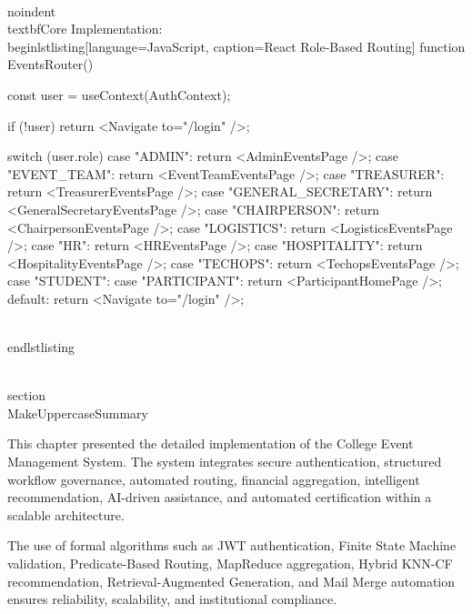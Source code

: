 \\noindent\\textbf{Core Implementation:}
\\begin{lstlisting}[language=JavaScript, caption=React Role-Based Routing]
function EventsRouter() {
  const { user } = useContext(AuthContext);
  
  if (!user) return <Navigate to="/login" />;
  
  switch (user.role) {
    case "ADMIN":
      return <AdminEventsPage />;
    case "EVENT_TEAM":
      return <EventTeamEventsPage />;
    case "TREASURER":
      return <TreasurerEventsPage />;
    case "GENERAL_SECRETARY":
      return <GeneralSecretaryEventsPage />;
    case "CHAIRPERSON":
      return <ChairpersonEventsPage />;
    case "LOGISTICS":
      return <LogisticsEventsPage />;
    case "HR":
      return <HREventsPage />;
    case "HOSPITALITY":
      return <HospitalityEventsPage />;
    case "TECHOPS":
      return <TechopsEventsPage />;
    case "STUDENT":
    case "PARTICIPANT":
      return <ParticipantHomePage />;
    default:
      return <Navigate to="/login" />;
  }
}
\\end{lstlisting}

\\section{\\MakeUppercase{Summary}}

This chapter presented the detailed implementation of the College Event Management System. The system integrates secure authentication, structured workflow governance, automated routing, financial aggregation, intelligent recommendation, AI-driven assistance, and automated certification within a scalable architecture.

The use of formal algorithms such as JWT authentication, Finite State Machine validation, Predicate-Based Routing, MapReduce aggregation, Hybrid KNN-CF recommendation, Retrieval-Augmented Generation, and Mail Merge automation ensures reliability, scalability, and institutional compliance.

